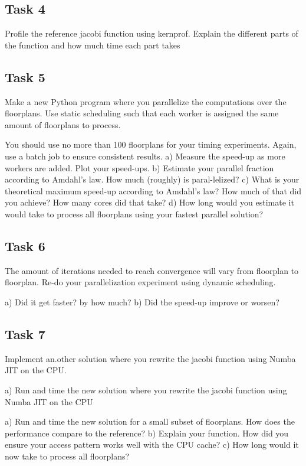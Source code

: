 \documentclass[a4paper,12pt]{article}
\begin{document}
\subsection{Task 4}

Profile the reference jacobi function using kernprof. Explain the different parts of the function and how much time each part takes

\subsection{Task 5}

Make a new Python program where you parallelize the computations over the floorplans. Use static scheduling such that each worker is assigned the same amount of floorplans to process.

You should use no more than 100 floorplans for your timing experiments. Again, use a batch job to ensure consistent results.
a) Measure the speed-up as more workers are added. Plot your speed-ups.
b) Estimate your parallel fraction according to Amdahl's law. How much (roughly) is paral-lelized?
c) What is your theoretical maximum speed-up according to Amdahl's law? How much of that did you achieve? How many cores did that take?
d) How long would you estimate it would take to process all floorplans using your fastest parallel solution?

\subsection{Task 6}
The amount of iterations needed to reach convergence will vary from floorplan to floorplan. Re-do your parallelization experiment using dynamic scheduling.

a) Did it get faster? by how much?
b) Did the speed-up improve or worsen?

\subsection{Task 7}
Implement an.other solution where you rewrite the jacobi function using Numba JIT on the CPU.

a) Run and time the new solution where you rewrite the jacobi function using Numba JIT on the CPU

a) Run and time the new solution for a small subset of floorplans. How does the performance compare to the reference?
b) Explain your function. How did you ensure your access pattern works well with the CPU cache?
c) How long would it now take to process all floorplans?
\end{document}

